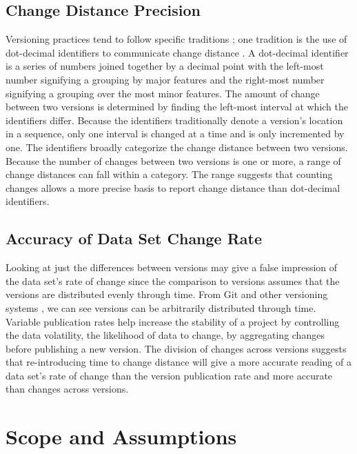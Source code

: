 \subsection{Change Distance Precision}

Versioning practices tend to follow specific traditions \cite{barkstrom2014earth}; one tradition is the use of dot-decimal identifiers to communicate change distance \cite{Tagger2005}.
A dot-decimal identifier is a series of numbers joined together by a decimal point with the left-most number signifying a grouping by major features and the right-most number signifying a grouping over the most minor features.
The amount of change between two versions is determined by finding the left-most interval at which the identifiers differ.
Because the identifiers traditionally denote a version's location in a sequence, only one interval is changed at a time and is only incremented by one.
The identifiers broadly categorize the change distance between two versions.
Because the number of changes between two versions is one or more, a range of change distances can fall within a category.
The range suggests that counting changes allows a more precise basis to report change distance than dot-decimal identifiers.

\subsection{Accuracy of Data Set Change Rate}

Looking at just the differences between versions may give a false impression of the data set's rate of change since the comparison to versions assumes that the versions are distributed evenly through time.
From Git \cite{Chacon:2009:PG:1618548} and other versioning systems \cite{Branco2008}, we can see versions can be arbitrarily distributed through time.
Variable publication rates help increase the stability of a project by controlling the data volatility, the likelihood of data to change, by aggregating changes before publishing a new version.
The division of changes across versions suggests that re-introducing time to change distance will give a more accurate reading of a data set's rate of change than the version publication rate and more accurate than changes across versions.

\section{Scope and Assumptions}

